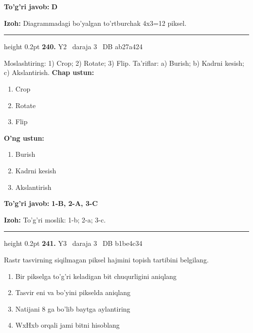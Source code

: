 \documentclass[10pt,a4paper,oneside]{article}
\begin{document}
\begin{tcolorbox}[enhanced,breakable,colback=teal!4,colframe=teal!45!black,boxrule=0.45pt,arc=1.2mm,left=2.8mm,right=2.8mm,top=2mm,bottom=2mm,before skip=2mm,after skip=2mm]
\textbf{\color{teal}To'g'ri javob:} \textbf{D}
\par\smallskip
\textbf{Izoh:} Diagrammadagi bo'yalgan to'rtburchak 4x3=12 piksel.
\end{tcolorbox}
\vspace{2mm}\hrule height 0.2pt \vspace{4mm}
\hypertarget{q240}{\textbf{\color{ink}240.}}  {\color{muted}\scriptsize Y2 \textbullet\ daraja 3 \textbullet\ DB ab27a424}
\par
Moslashtiring: 1) Crop; 2) Rotate; 3) Flip. Ta'riflar: a) Burish; b) Kadrni kesish; c) Akslantirish.
\textbf{\footnotesize Chap ustun:}
\begin{enumerate}[label=\arabic*),leftmargin=9mm]
\item Crop
\item Rotate
\item Flip
\end{enumerate}
\textbf{\footnotesize O'ng ustun:}
\begin{enumerate}[label=\Alph*),leftmargin=9mm]
\item Burish
\item Kadrni kesish
\item Akslantirish
\end{enumerate}
\begin{tcolorbox}[enhanced,breakable,colback=teal!4,colframe=teal!45!black,boxrule=0.45pt,arc=1.2mm,left=2.8mm,right=2.8mm,top=2mm,bottom=2mm,before skip=2mm,after skip=2mm]
\textbf{\color{teal}To'g'ri javob:} \textbf{1-B, 2-A, 3-C}
\par\smallskip
\textbf{Izoh:} To'g'ri moslik: 1-b; 2-a; 3-c.
\end{tcolorbox}
\vspace{2mm}\hrule height 0.2pt \vspace{4mm}
\hypertarget{q241}{\textbf{\color{ink}241.}}  {\color{muted}\scriptsize Y3 \textbullet\ daraja 3 \textbullet\ DB b1be4c34}
\par
Rastr tasvirning siqilmagan piksel hajmini topish tartibini belgilang.
\begin{enumerate}[label=\Alph*),leftmargin=9mm]
\item Bir pikselga to'g'ri keladigan bit chuqurligini aniqlang
\item Tasvir eni va bo'yini pikselda aniqlang
\item Natijani 8 ga bo'lib baytga aylantiring
\item WxHxb orqali jami bitni hisoblang
\end{enumerate}
\end{document}
